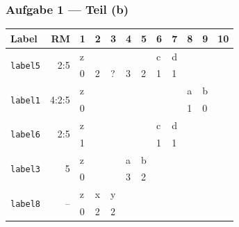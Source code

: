 \documentclass{beamer}
\begin{document}
\begin{frame} \frametitle{Aufgabe 1 --- Teil (b)}
	\centering
	\def\arraystretch{0.9}
	
	\begin{tabular}{|p{1.4cm}|r||R{0.3cm}|R{0.3cm}|R{0.3cm}|R{0.3cm}|R{0.3cm}|R{0.3cm}|R{0.3cm}|R{0.3cm}|R{0.3cm}|R{0.3cm}|}
		\hline
		Label & RM & 1 & 2 & 3 & 4 & 5 & 6 & 7 & 8 & 9 & 10 \\ 
		\hline \hline
		[0]{*}{\texttt{label5}} & [0]{*}{2:5} & z &  &  &       &       & c      & d      &       &  &\\
		&       & 0     & 2     & ? & 3     & 2     & 1     & 1     &       &  &\\ \hline
		[0]{*}{\texttt{label1}} & [0]{*}{4:2:5} & z &       &       &  &  &       &       &      a & b &\\
		&       & 0     &       &       &      &    &       &       &      1 & 0 & \\ \hline
		[0]{*}{\texttt{label6}} & [0]{*}{2:5} & z &       &       &       &       & c & d &       &  &\\
		&       & 1     &       &       &       &       & 1     & 1     &       &  &\\ \hline
		[0]{*}{\texttt{label3}} & [0]{*}{5} & z &        &       & a     & b     &       &       &  &  &\\
		&       & 0     &       &       & 3     & 2     &       &       &      &  &\\ \hline
		[0]{*}{\texttt{label8}} & [0]{*}{--} & z &  x    & y     &      &       &  &  &       & & \\
		&       & 0     & 2     & 2     &       &       &     &     &       &  & \\ \hline
	\end{tabular}
\end{frame}









\end{document}
